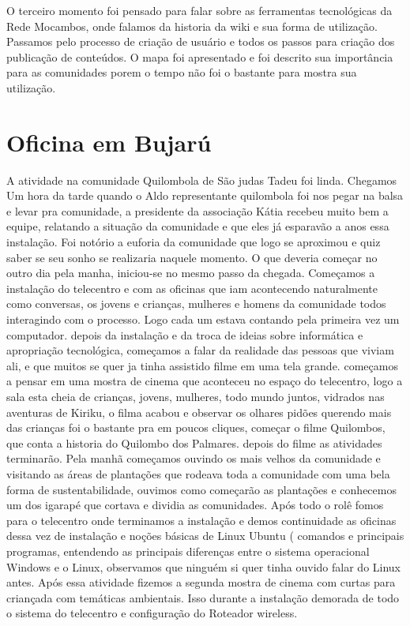\documentclass[a4paper, 11pt, oneside]{Relatorio_sem}  %
\begin{document}
O terceiro momento foi pensado para falar sobre as ferramentas
tecnológicas da Rede Mocambos, onde falamos da historia da wiki e sua
forma de utilização. Passamos pelo processo de criação de usuário e
todos os passos para criação dos publicação de conteúdos. O mapa foi
apresentado e foi descrito sua importância para as comunidades porem o
tempo não foi o bastante para mostra sua utilização.

\section{Oficina em Bujarú}
A atividade na comunidade Quilombola de São judas Tadeu foi
linda. Chegamos Um hora da tarde quando o Aldo representante
quilombola foi nos pegar na balsa e levar pra comunidade, a presidente
da associação Kátia recebeu muito bem a equipe, relatando a situação
da comunidade e que eles já esparavão a anos essa instalação. Foi
notório a euforia da comunidade que logo se aproximou e quiz saber se
seu sonho se realizaria naquele momento. O que deveria começar no
outro dia pela manha, iniciou-se no mesmo passo da chegada. Começamos
a instalação do telecentro e com as oficinas que iam acontecendo
naturalmente como conversas, os jovens e crianças, mulheres e homens
da comunidade todos interagindo com o processo. Logo cada um estava
contando pela primeira vez um computador. depois da instalação e da
troca de ideias sobre informática e apropriação tecnológica, começamos
a falar da realidade das pessoas que viviam ali, e que muitos se quer
ja tinha assistido filme em uma tela grande. começamos a pensar em uma
mostra de cinema que aconteceu no espaço do telecentro, logo a sala
esta cheia de crianças, jovens, mulheres, todo mundo juntos, vidrados
nas aventuras de Kiriku, o filma acabou e observar os olhares pidões
querendo mais das crianças foi o bastante pra em poucos cliques,
começar o filme Quilombos, que conta a historia do Quilombo dos
Palmares. depois do filme as atividades terminarão. Pela manhã
começamos ouvindo os mais velhos da comunidade e visitando as áreas de
plantações que rodeava toda a comunidade com uma bela forma de
sustentabilidade, ouvimos como começarão as plantações e conhecemos um
dos igarapé que cortava e dividia as comunidades. Após todo o rolê
fomos para o telecentro onde terminamos a instalação e demos
continuidade as oficinas dessa vez de instalação e noções básicas de
Linux Ubuntu ( comandos e principais programas, entendendo as
principais diferenças entre o sistema operacional Windows e o Linux,
observamos que ninguém si quer tinha ouvido falar do Linux antes. Após
essa atividade fizemos a segunda mostra de cinema com curtas para
criançada com temáticas ambientais. Isso durante a instalação demorada
de todo o sistema do telecentro e configuração do Roteador wireless.
\end{document}
